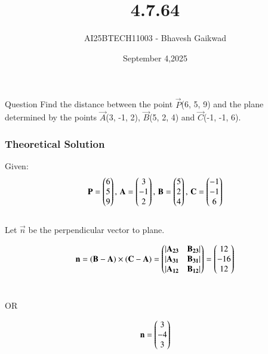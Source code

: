 \documentclass{beamer}
\title
{4.7.64}
\date{September 4,2025}
\author 
{AI25BTECH11003 - Bhavesh Gaikwad}
\begin{document}
\frame{\titlepage}
\begin{frame}{Question}
\centering
Find the distance between the point $\vec{P}$(6, 5, 9) and the plane determined by the points $\vec{A}$(3, -1, 2), $\vec{B}$(5, 2, 4) and $\vec{C}$(-1, -1, 6).
\end{frame}


\begin{frame}[fragile]
    \frametitle{Theoretical Solution}
Given:
\begin{equation}
\mathbf{P} = \begin{pmatrix}6 \\ 5 \\ 9\end{pmatrix}, \, \mathbf{A} = \begin{pmatrix}3 \\ -1 \\ 2\end{pmatrix}, \, \mathbf{B} = \begin{pmatrix}5 \\ 2 \\ 4\end{pmatrix}, \, \mathbf{C} = \begin{pmatrix}-1 \\ -1 \\ 6\end{pmatrix}
\end{equation}\\
Let $\vec{n}$ be the perpendicular vector to plane.

\begin{equation}
    \mathbf{n} = \mathbf{(B-A)} \times \mathbf{(C-A)} = \begin{pmatrix}|\mathbf{A_{23}} & \mathbf{B_{23}}| \\ |\mathbf{A_{31}} & \mathbf{B_{31}}| \\ |\mathbf{A_{12}} & \mathbf{B_{12}}|\end{pmatrix} = \begin{pmatrix}12 \\ -16 \\ 12\end{pmatrix}
\end{equation}\\

\begin{center}
    OR
\end{center}

\begin{equation}
\mathbf{n} = \begin{pmatrix}3 \\ -4 \\ 3\end{pmatrix}
\end{equation}\\

\end{frame}
\end{document}
